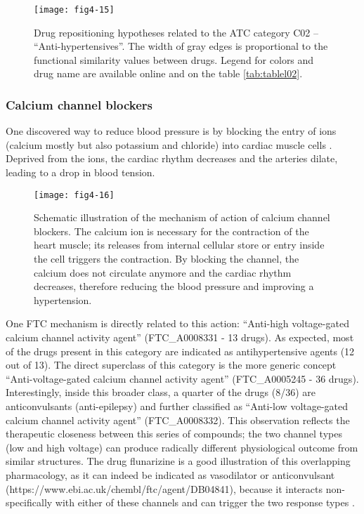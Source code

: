 \begin{figure}[H]
    \centering
    \texttt{[image: fig4-15]}
    \caption{Drug repositioning hypotheses related to the ATC category C02 – “Anti-hypertensives”. The width of gray edges is proportional to the functional similarity values between drugs. Legend for colors and drug name are available online and on the table \ref{tab:tablel02}.}
    \label{fig4-15}
\end{figure}

\subsubsection{Calcium channel blockers}
One discovered way to reduce blood pressure is by blocking the entry of ions (calcium mostly but also potassium and chloride) into cardiac muscle cells \citep{swedberg2005task}. Deprived from the ions, the cardiac rhythm decreases and the arteries dilate, leading to a drop in blood tension.

\begin{figure}[H]
    \centering
    \texttt{[image: fig4-16]}
    \caption{Schematic illustration of the mechanism of action of calcium channel blockers. The calcium ion is necessary for the contraction of the heart muscle; its releases from internal cellular store or entry inside the cell triggers the contraction. By blocking the channel, the calcium does not circulate anymore and the cardiac rhythm decreases, therefore reducing the blood pressure and improving a hypertension.}
    \label{fig4-16}
\end{figure}

One FTC mechanism is directly related to this action: “Anti-high voltage-gated calcium channel activity agent” (FTC\_A0008331 - 13 drugs). As expected, most of the drugs present in this category are indicated as antihypertensive agents (12 out of 13). The direct superclass of this category is the more generic concept “Anti-voltage-gated calcium channel activity agent” (FTC\_A0005245 - 36 drugs). Interestingly, inside this broader class, a quarter of the drugs (8/36) are anticonvulsants (anti-epilepsy) and further classified as “Anti-low voltage-gated calcium channel activity agent” (FTC\_A0008332). This observation reflects the therapeutic closeness between this series of compounds; the two channel types (low and high voltage) can produce radically different physiological outcome from similar structures. The drug flunarizine is a good illustration of this overlapping pharmacology, as it can indeed be indicated as vasodilator or anticonvulsant (https://www.ebi.ac.uk/chembl/ftc/agent/DB04841), because it interacts non-specifically with either of these channels and can trigger the two response types \citep{van1978effect}.

